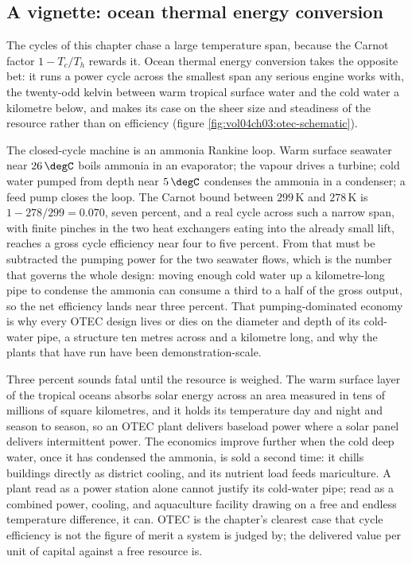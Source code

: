 \subsection{A vignette: ocean thermal energy conversion}

The cycles of this chapter chase a large temperature span, because the Carnot
factor $1 - T_c/T_h$ rewards it. Ocean thermal energy conversion takes the
opposite bet: it runs a power cycle across the smallest span any serious engine
works with, the twenty-odd kelvin between warm tropical surface water and the cold
water a kilometre below, and makes its case on the sheer size and steadiness of
the resource rather than on efficiency (figure
\ref{fig:vol04ch03:otec-schematic}).

The closed-cycle machine is an ammonia Rankine loop. Warm surface seawater near
$26\,\degC$ boils ammonia in an evaporator; the vapour drives a turbine; cold
water pumped from depth near $5\,\degC$ condenses the ammonia in a condenser; a
feed pump closes the loop. The Carnot bound between $299\,\si{\kelvin}$ and
$278\,\si{\kelvin}$ is $1 - 278/299 = 0.070$, seven percent, and a real cycle
across such a narrow span, with finite pinches in the two heat exchangers eating
into the already small lift, reaches a gross cycle efficiency near four to five
percent. From that must be subtracted the pumping power for the two seawater
flows, which is the number that governs the whole design: moving enough cold water
up a kilometre-long pipe to condense the ammonia can consume a third to a half of
the gross output, so the net efficiency lands near three percent. That
pumping-dominated economy is why every OTEC design lives or dies on the diameter
and depth of its cold-water pipe, a structure ten metres across and a kilometre
long, and why the plants that have run have been demonstration-scale.

Three percent sounds fatal until the resource is weighed. The warm surface layer
of the tropical oceans absorbs solar energy across an area measured in tens of
millions of square kilometres, and it holds its temperature day and night and
season to season, so an OTEC plant delivers baseload power where a solar panel
delivers intermittent power. The economics improve further when the cold deep
water, once it has condensed the ammonia, is sold a second time: it chills
buildings directly as district cooling, and its nutrient load feeds mariculture.
A plant read as a power station alone cannot justify its cold-water pipe; read as
a combined power, cooling, and aquaculture facility drawing on a free and endless
temperature difference, it can. OTEC is the chapter's clearest case that cycle
efficiency is not the figure of merit a system is judged by; the delivered value
per unit of capital against a free resource is.

